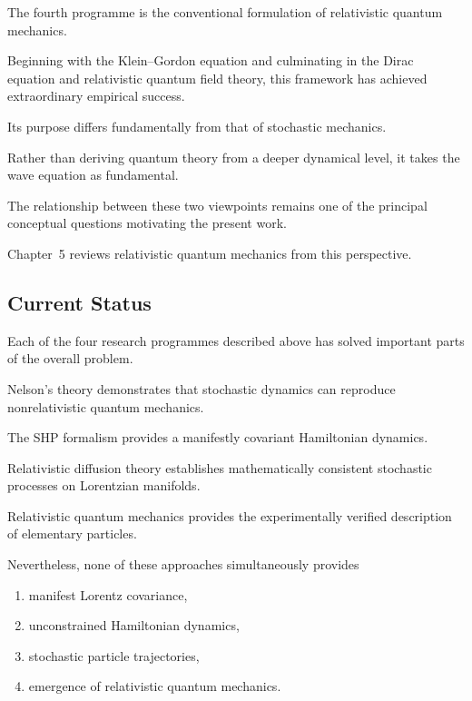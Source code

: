 The fourth programme is the conventional formulation of relativistic
quantum mechanics.

Beginning with the Klein--Gordon equation and culminating in the Dirac
equation and relativistic quantum field theory, this framework has
achieved extraordinary empirical success.

Its purpose differs fundamentally from that of stochastic mechanics.

Rather than deriving quantum theory from a deeper dynamical level, it
takes the wave equation as fundamental.

The relationship between these two viewpoints remains one of the
principal conceptual questions motivating the present work.

Chapter~5 reviews relativistic quantum mechanics from this perspective.

\subsection{Current Status}

Each of the four research programmes described above has solved
important parts of the overall problem.

Nelson's theory demonstrates that stochastic dynamics can reproduce
nonrelativistic quantum mechanics.

The SHP formalism provides a manifestly covariant Hamiltonian dynamics.

Relativistic diffusion theory establishes mathematically consistent
stochastic processes on Lorentzian manifolds.

Relativistic quantum mechanics provides the experimentally verified
description of elementary particles.

Nevertheless, none of these approaches simultaneously provides

\begin{enumerate}

\item manifest Lorentz covariance,

\item unconstrained Hamiltonian dynamics,

\item stochastic particle trajectories,

\item emergence of relativistic quantum mechanics.

\end{enumerate}

